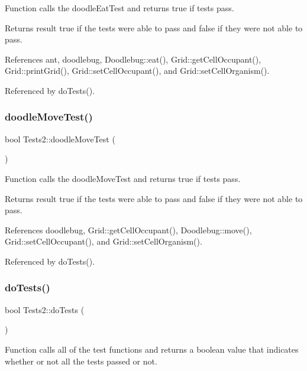 Function calls the doodle\+Eat\+Test and returns true if tests pass.

\begin{DoxyReturn}{Returns}
result true if the tests were able to pass and false if they were not able to pass. 
\end{DoxyReturn}


References ant, doodlebug, Doodlebug\+::eat(), Grid\+::get\+Cell\+Occupant(), Grid\+::print\+Grid(), Grid\+::set\+Cell\+Occupant(), and Grid\+::set\+Cell\+Organism().



Referenced by do\+Tests().

\mbox{\label{classTests2_a2143f2192836626e7214d37b504df381}} 
\subsubsection{doodle\+Move\+Test()}
{\footnotesize\ttfamily bool Tests2\+::doodle\+Move\+Test (\begin{DoxyParamCaption}{ }\end{DoxyParamCaption})}

Function calls the doodle\+Move\+Test and returns true if tests pass.

\begin{DoxyReturn}{Returns}
result true if the tests were able to pass and false if they were not able to pass. 
\end{DoxyReturn}


References doodlebug, Grid\+::get\+Cell\+Occupant(), Doodlebug\+::move(), Grid\+::set\+Cell\+Occupant(), and Grid\+::set\+Cell\+Organism().



Referenced by do\+Tests().

\mbox{\label{classTests2_a7392382310966597d685c8aa3a4a2f88}} 
\subsubsection{do\+Tests()}
{\footnotesize\ttfamily bool Tests2\+::do\+Tests (\begin{DoxyParamCaption}{ }\end{DoxyParamCaption})}

Function calls all of the test functions and returns a boolean value that indicates whether or not all the tests passed or not.

